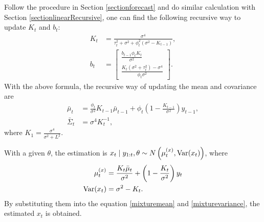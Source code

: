 Follow the procedure in Section \ref{sectionforecast} and do similar calculation with Section \ref{sectionlinearRecursive}, one can find the following recursive way to update $K_{t}$ and $b_{t}$: 
\begin{align} \label{linearOUKirreg}
K_{t}  &=\frac{\sigma^4}{\tau_t^2+\sigma^2+\phi_t^2(\sigma^2-K_{t-1})},\\
b_{t} &= \begin{bmatrix}
\frac{b_{t-1}\phi_t K_{t}}{\sigma^2} \\\label{linearOUbirreg} \frac{K_{t}(\sigma^2+\tau_t^2)-\sigma^4 }{\phi_t\sigma^2}
\end{bmatrix}. 
\end{align}
With the above formula, the recursive way of updating the mean and covariance are 
\begin{align} \label{linearOUmu}
\bar{\mu}_{t}       & = \frac{\phi_t}{\sigma^2}K_{t-1}\bar{\mu}_{t-1} + \phi_t \left(1 - \frac{K_{t-1}}{\sigma^2}\right)y_{t-1}, \\
\bar{\Sigma}_{t}  &= \sigma^4K_{t}^{-1}, \label{linearOUsigma}
\end{align}
where $K_1=\frac{\sigma^4}{\sigma^2+L^2}$. 
%


With a given $\theta$, the estimation is $x_{t}\mid y_{1:t},\theta \sim N\left(\mu_{t}^{(x)},\mathrm{Var}(x_t)\right)$, where
\begin{align}\label{linearOUmean}
\mu_{t}^{(x)} &  =  \frac{K_{t}\bar{\mu}_{t}}{\sigma^2}+\left(1-\frac{K_{t}}{\sigma^2}\right)y_{t} \\ \label{linearOUvar}
\mathrm{Var}(x_t)&= \sigma^2-K_{t}.
\end{align}
By substituting them into the equation \eqref{mixturemean} and \eqref{mixturevariance}, the estimated $x_t$ is obtained. 

